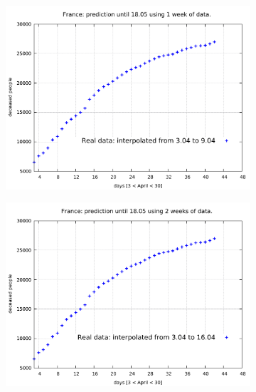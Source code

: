 \documentclass[8pt]{article}
\begin{document}
\begin{figure}[h!]
  \centering
  \begin{subfigure}[b]{0.45\linewidth}
  \includegraphics[width=\linewidth]{../tuned/fr/3-9/3-9.pdf}
  \end{subfigure}
  \begin{subfigure}[b]{0.45\linewidth}
    \includegraphics[width=\linewidth]{../tuned/fr/3-16/3-16.pdf}
  \end{subfigure}
  \begin{subfigure}[b]{0.45\linewidth}

\end{subfigure}
\end{figure}
\end{document}
